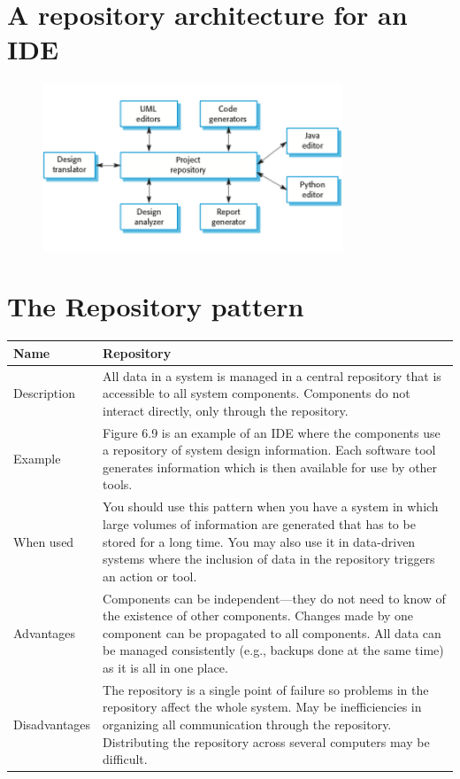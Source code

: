 \section{A repository architecture for an IDE}
\begin{figure}[h!]
    \centering
    \includegraphics[width = 0.8\textwidth]{./figures/L3_6.png}
    \caption{}
    \label{fig:L3_6}
\end{figure}
\newpage
\section{The Repository pattern}


\begin{table}[h!]
\centering
\begin{tabular}{ |p{3cm}|p{8cm}|  }
\hline
Name & Repository\\
\hline
\hline
Description & All data in a system is managed in a central repository that is accessible to all system components. Components do not interact directly, only through the repository.\\
\hline
Example & Figure 6.9 is an example of an IDE where the components use a repository of system design information. Each software tool generates information which is then available for use by other tools.\\
\hline
When used & You should use this pattern when you have a system in which large volumes of information are generated that has to be stored for a long time. You may also use it in data-driven systems where the inclusion of data in the repository triggers an action or tool.\\
\hline
Advantages & Components can be independent—they do not need to know of the existence of other components. Changes made by one component can be propagated to all components. All data can be managed consistently (e.g., backups done at the same time) as it is all in one place.\\
\hline
Disadvantages & The repository is a single point of failure so problems in the repository affect the whole system. May be inefficiencies in organizing all communication through the repository. Distributing the repository across several computers may be difficult.\\
\hline
\end{tabular}

\label{table:T2_3}
\end{table}



